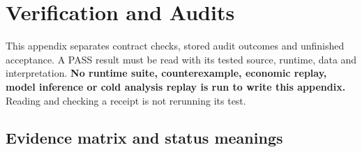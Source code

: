 \chapter{Verification and Audits}\label{s:7cc924d7aab8fe78}

This appendix separates contract checks, stored audit outcomes and
unfinished acceptance. A PASS result must be read with its tested source,
runtime, data and interpretation. \textbf{No runtime suite, counterexample,
economic replay, model inference or cold analysis replay is run to write
this appendix.} Reading and checking a receipt is not rerunning its test.

\section{Evidence matrix and status meanings}\label{s:8356fa5ade54dd36}

\begingroup
\small
{}
\setlength{\tabcolsep}{3pt}

